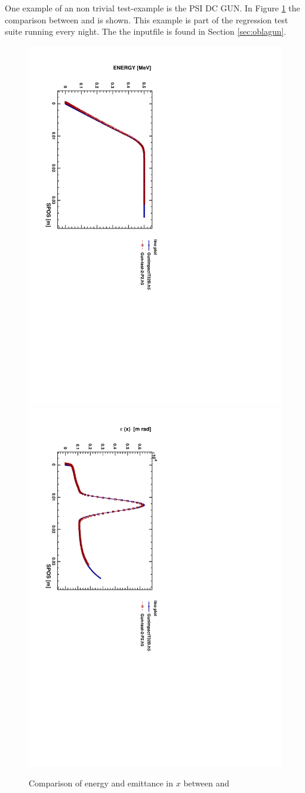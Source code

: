One example of an non trivial test-example is the PSI DC GUN. In Figure \ref{fig:guncomp1} the comparison between \impactt and \opalt is shown. This example is part of the regression test suite
running every night. The the inputfile is found in Section \ref{sec:oblagun}.  
\begin{figure}[ht]
 \begin{center} 
   \includegraphics[width=0.60\linewidth,angle=90]{figures/Gun/GunCompEn}
   \includegraphics[width=0.60\linewidth,angle=90]{figures/Gun/GunCompEx}
   \caption{Comparison of energy and emittance in $x$ between \impactt and \opalt}   
   \label{fig:guncomp1}
 \end{center}
\end{figure}

